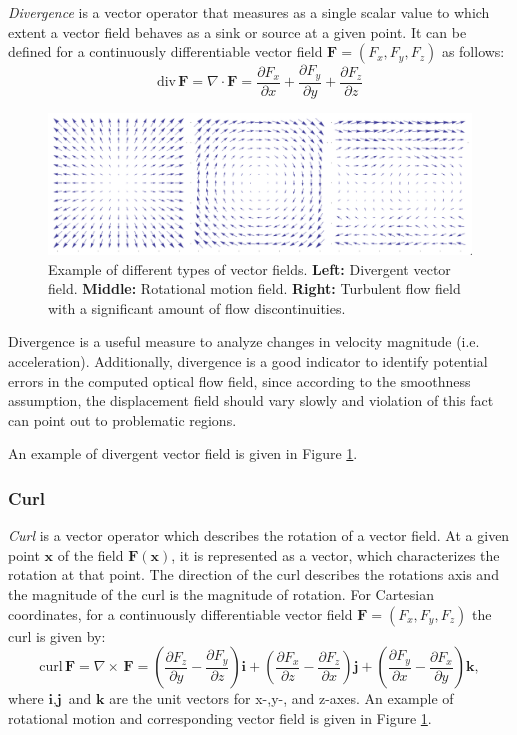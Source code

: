 \textit{Divergence} is a vector operator that measures as a single scalar value to which extent a vector field behaves as a sink or source at a given point. It can be defined for a continuously differentiable vector field $\textbf{F}=(F_x,F_y,F_z)$ as follows:
$$\text{div} \, \textbf{F} = \nabla \cdot \textbf{F} = \frac{\partial F_x}{\partial x} + \frac{\partial F_y}{\partial y} + \frac{\partial F_z}{\partial z} $$


\begin{figure}[ht]
  \centerline{
    \mbox{\includegraphics[scale= 0.4]{figures/vector_fields.png}}
  }

  \caption[Noise filterst]{Example of different types of vector fields.  \textbf{Left:} Divergent vector field. \textbf{Middle:} Rotational motion field. \textbf{Right:} Turbulent flow field with a significant amount of flow discontinuities.}
  \label{fig:vector_fields}
\end{figure}

Divergence is a useful measure to analyze changes in velocity magnitude (i.e. acceleration). Additionally, divergence is a good indicator to identify potential errors in the computed optical flow field, since according to the smoothness assumption, the displacement field should vary slowly and violation of this fact can point out to problematic regions.  

An example of divergent vector field is given in Figure \ref{fig:vector_fields}. 

\subsubsection{Curl}
\label{curl}

\textit{Curl} is a vector operator which describes the rotation of a vector field. At a given point $\textbf{x}$ of the field $\textbf{F}(\textbf{x})$, it is represented as a vector, which characterizes the rotation at that point. The direction of the curl describes the rotations axis and the magnitude of the curl is the magnitude of rotation. 
For Cartesian coordinates, for a continuously differentiable vector field $\textbf{F}=(F_x,F_y,F_z)$ the curl is given by:
$$ \text{curl} \, \textbf{F} = \nabla \times \, \textbf{F} = \left( \frac{\partial F_z}{\partial y} - \frac{\partial F_y}{\partial z} \right) \textbf{i} + \left( \frac{\partial F_x}{\partial z} - \frac{\partial F_z}{\partial x} \right) \textbf{j} + \left(  \frac{\partial F_y}{\partial x} - \frac{\partial F_x}{\partial y} \right) \textbf{k},$$
where $\textbf{i}, \textbf{j}$ and $\textbf{k}$ are the unit vectors for x-,y-, and z-axes.
An example of rotational motion and corresponding vector field is given in Figure \ref{fig:vector_fields}. 


